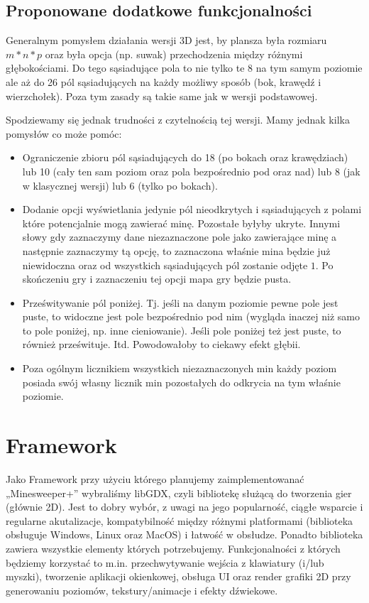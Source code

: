 \documentclass[12pt, A4]{article}
\begin{document}
\subsection{Proponowane dodatkowe funkcjonalności}
Generalnym pomysłem działania wersji 3D jest, by plansza była rozmiaru $m*n*p$ oraz była opcja (np. suwak) przechodzenia między różnymi głębokościami. Do tego sąsiadujące pola to nie tylko te 8 na tym samym poziomie ale aż do 26 pól sąsiadujących na każdy możliwy sposób (bok, krawędź i wierzchołek). Poza tym zasady są takie same jak w wersji podstawowej. \par
Spodziewamy się jednak trudności z czytelnością tej wersji. Mamy jednak kilka pomysłów co może pomóc:
\begin{itemize}
\item Ograniczenie zbioru pól sąsiadujących do 18 (po bokach oraz krawędziach) lub 10 (cały ten sam poziom oraz pola bezpośrednio pod oraz nad) lub 8 (jak w klasycznej wersji) lub 6 (tylko po bokach).
\item Dodanie opcji wyświetlania jedynie pól nieodkrytych i sąsiadujących z polami które potencjalnie mogą zawierać minę. Pozostałe byłyby ukryte. Innymi słowy gdy zaznaczymy dane niezaznaczone pole jako zawierające minę a następnie zaznaczymy tą opcję, to zaznaczona właśnie mina będzie już niewidoczna oraz od wszystkich sąsiadujących pól zostanie odjęte $1$. Po skończeniu gry i zaznaczeniu tej opcji mapa gry będzie pusta.
\item Prześwitywanie pól poniżej. Tj. jeśli na danym poziomie pewne pole jest puste, to widoczne jest pole bezpośrednio pod nim (wygląda inaczej niż samo to pole poniżej, np. inne cieniowanie). Jeśli pole poniżej też jest puste, to również prześwituje. Itd. Powodowałoby to ciekawy efekt głębii.
\item Poza ogólnym licznikiem wszystkich niezaznaczonych min każdy poziom posiada swój własny licznik min pozostałych do odkrycia na tym właśnie poziomie.
\end{itemize}

\section{Framework}
Jako Framework przy użyciu którego planujemy zaimplementowanać „Minesweeper+” wybraliśmy libGDX, czyli bibliotekę służącą do tworzenia gier (głównie 2D). Jest to dobry wybór, z uwagi na jego popularność, ciągłe wsparcie i regularne akutalizacje, kompatybilność między różnymi platformami (biblioteka obsługuje Windows, Linux oraz MacOS) i łatwość w obsłudze. Ponadto biblioteka zawiera wszystkie elementy których potrzebujemy. Funkcjonalności z których będziemy korzystać to m.in. przechwytywanie wejścia z klawiatury (i/lub myszki), tworzenie aplikacji okienkowej, obsługa UI oraz render grafiki 2D przy generowaniu poziomów, tekstury/animacje i efekty dźwiekowe.
\end{document}
